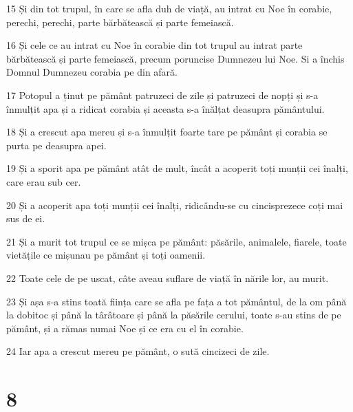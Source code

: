 \par 15 Și din tot trupul, în care se afla duh de viață, au intrat cu Noe în corabie, perechi, perechi, parte bărbătească și parte femeiască.
\par 16 Și cele ce au intrat cu Noe în corabie din tot trupul au intrat parte bărbătească și parte femeiască, precum poruncise Dumnezeu lui Noe. Si a închis Domnul Dumnezeu corabia pe din afară.
\par 17 Potopul a ținut pe pământ patruzeci de zile și patruzeci de nopți și s-a înmulțit apa și a ridicat corabia și aceasta s-a înălțat deasupra pământului.
\par 18 Și a crescut apa mereu și s-a înmulțit foarte tare pe pământ și corabia se purta pe deasupra apei.
\par 19 Și a sporit apa pe pământ atât de mult, încât a acoperit toți munții cei înalți, care erau sub cer.
\par 20 Și a acoperit apa toți munții cei înalți, ridicându-se cu cincisprezece coți mai sus de ei.
\par 21 Și a murit tot trupul ce se mișca pe pământ: păsările, animalele, fiarele, toate vietățile ce mișunau pe pământ și toți oamenii.
\par 22 Toate cele de pe uscat, câte aveau suflare de viață în nările lor, au murit.
\par 23 Și așa s-a stins toată ființa care se afla pe fața a tot pământul, de la om până la dobitoc și până la târâtoare și până la păsările cerului, toate s-au stins de pe pământ, și a rămas numai Noe și ce era cu el în corabie.
\par 24 Iar apa a crescut mereu pe pământ, o sută cincizeci de zile.

\chapter{8}

